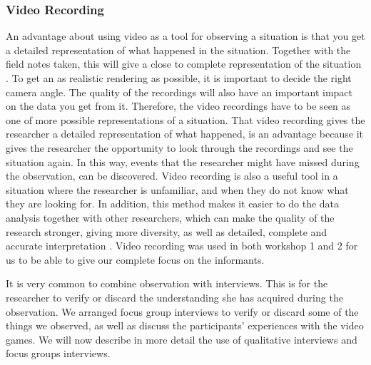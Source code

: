\subsubsection{Video Recording}
An advantage about using video as a tool for observing a situation is that you get a detailed representation of what happened in the situation. Together with the field notes taken, this will give a close to complete representation of the situation \cite{tjora}. To get an as realistic rendering as possible, it is important to decide the right camera angle. The quality of the recordings will also have an important impact on the data you get from it. Therefore, the video recordings have to be seen as one of more possible representations of a situation.  That video recording gives the researcher a detailed representation of what happened, is an advantage because it gives the researcher the opportunity to look through the recordings and see the situation again. In this way, events that the researcher might have missed during the observation, can be discovered. Video recording is also a useful tool in a situation where the researcher is unfamiliar, and when they do not know what they are looking for. In addition, this method makes it easier to do the data analysis together with other researchers, which can make the quality of the research stronger, giving more diversity, as well as detailed, complete and accurate interpretation \cite{tjora}. Video recording was used in both workshop 1 and 2 for us to be able to give our complete focus on the informants.

It is very common to combine observation with interviews. This is for the researcher to verify or discard the understanding she has acquired during the observation. We arranged focus group interviews to verify or discard some of the things we observed, as well as discuss the participants' experiences with the video games. We will now describe in more detail the use of qualitative interviews and focus groups interviews. 

